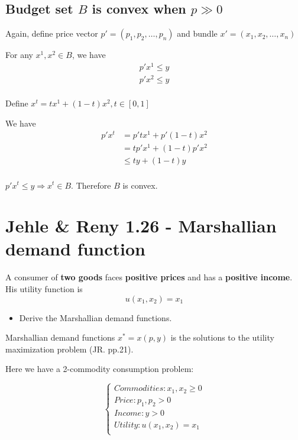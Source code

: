 \documentclass{article}
\begin{document}
\subsection{Budget set $B$ is convex when $p \gg 0$}

Again, define price vector $p' = (p_1, p_2, \ldots, p_n)$ and bundle ${x}' = (x_1, x_2, \ldots, x_n)$

For any $x^1, x^2 \in B$, we have 
\begin{align*}  
     p'x^1 \le y \\
     p'x^2 \le y \\
\end{align*}

Define $x^t = tx^1 + (1-t)x^2, t \in [0,1]$

We have 
\begin{align*}  
  p'x^t &=  p'tx^1 +  p'(1-t)x^2 \\
        &=  tp'x^1 +  (1-t)p'x^2 \\
        &\le  ty +  (1-t)y \\
\end{align*}

$p'x^t \le y \Rightarrow x^t \in B$. Therefore $B$ is convex.

\section{Jehle \& Reny 1.26 - Marshallian demand function}
A consumer of \textbf{two goods} faces \textbf{positive prices} and has a \textbf{positive income}. 
His utility function is $$u(x_1, x_2) = x_1$$ 
\begin{itemize}
\item Derive the Marshallian demand functions.
\end{itemize}

\begin{mdframed}[backgroundcolor=blue!20,linecolor=white]
Marshallian demand functions $x^* = x(p, y)$ is the solutions 
to the utility maximization problem (JR. pp.21).
\end{mdframed}

Here we have a 2-commodity consumption problem:

\begin{equation}
  \begin{cases}
  Commodities: x_1, x_2 \ge 0 \\
  Price: p_1, p_2 > 0 \\
  Income: y > 0 \\
  Utility: u(x_1,x_2) = x_1 \\
  
  \end{cases}
\end{equation}
\end{document}
